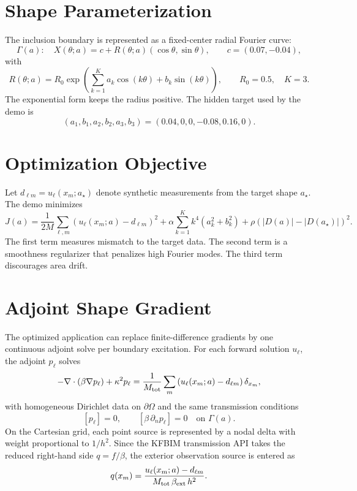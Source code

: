 \documentclass[11pt]{article}
\begin{document}
\section*{Shape Parameterization}

The inclusion boundary is represented as a fixed-center radial Fourier curve:
\[
    \Gamma(a):\quad
    X(\theta;a)
    =
    c + R(\theta;a)(\cos\theta,\sin\theta),
    \qquad
    c=(0.07,-0.04),
\]
with
\[
    R(\theta;a)
    =
    R_0\exp\left(
        \sum_{k=1}^{K}
        a_k\cos(k\theta)+b_k\sin(k\theta)
    \right),
    \qquad R_0=0.5,\quad K=3.
\]
The exponential form keeps the radius positive.  The hidden target used by the
demo is
\[
    (a_1,b_1,a_2,b_2,a_3,b_3)
    =
    (0.04,0,0,-0.08,0.16,0).
\]

\section*{Optimization Objective}

Let $d_{\ell m}=u_\ell(x_m;a_\star)$ denote synthetic measurements from the
target shape $a_\star$.  The demo minimizes
\[
    J(a)
    =
    \frac{1}{2M}
    \sum_{\ell,m}
    \left(u_\ell(x_m;a)-d_{\ell m}\right)^2
    + \alpha
    \sum_{k=1}^{K} k^4(a_k^2+b_k^2)
    + \rho\left(|D(a)|-|D(a_\star)|\right)^2.
\]
The first term measures mismatch to the target data.  The second term is a
smoothness regularizer that penalizes high Fourier modes.  The third term
discourages area drift.

\section*{Adjoint Shape Gradient}

The optimized application can replace finite-difference gradients by one
continuous adjoint solve per boundary excitation.  For each forward solution
$u_\ell$, the adjoint $p_\ell$ solves
\[
    -\nabla\cdot(\beta\nabla p_\ell)+\kappa^2p_\ell
    =
    \frac{1}{M_{\rm tot}}\sum_m
    \left(u_\ell(x_m;a)-d_{\ell m}\right)\delta_{x_m},
\]
with homogeneous Dirichlet data on $\partial\Omega$ and the same transmission
conditions
\[
    [p_\ell]=0,\qquad [\beta\,\partial_n p_\ell]=0
    \quad\text{on }\Gamma(a).
\]
On the Cartesian grid, each point source is represented by a nodal delta with
weight proportional to $1/h^2$.  Since the KFBIM transmission API takes the
reduced right-hand side $q=f/\beta$, the exterior observation source is entered
as
\[
    q(x_m)=
    \frac{u_\ell(x_m;a)-d_{\ell m}}
         {M_{\rm tot}\,\beta_{\rm ext}\,h^2}.
\]
\end{document}
